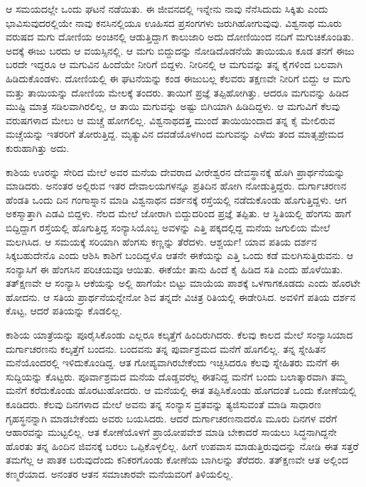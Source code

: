ಆ ಸಮಯದಲ್ಲೇ ಒಂದು ಘಟನೆ ನಡೆಯಿತು. ಈ ಜೀವನದಲ್ಲಿ ಇನ್ನೇನು ನಾವು ನೆನೆಸಿದುದು ಸಿಕ್ಕಿತು ಎಂದು ಭಾವಿಸುವುದರಲ್ಲಿಯೇ ನಾವು ಕನಸಿನಲ್ಲಿಯೂ ಊಹಿಸದ ಪ್ರಸಂಗಗಳು ಜರುಗಿಹೋಗುವುವು. ವಿಶ್ವನಾಥ ಮೂರು ವರುಷದ ಮಗು ದೋಣಿಯ ಅಂಚಿನಲ್ಲಿ ಆಡುತ್ತಿದ್ದಾಗ ಕಾಲುಜಾರಿ ಅದು ದೋಣಿಯಿಂದ ನದಿಗೆ ಮಗುಚಿಕೊಂಡಿತು. ಅದಕ್ಕೆ ಈಜು ಬರದು ಆ ವಯಸ್ಸಿನಲ್ಲಿ. ಆ ಮಗು ಬಿದ್ದುದನ್ನು ನೋಡಿದೊಡನೆಯೆ ತಾಯಿಯೂ ಕೂಡ ತನಗೆ ಈಜು ಬರದೇ ಇದ್ದರೂ ಆ ಮಗುವಿನ ಹಿಂದೆಯೇ ನೀರಿಗೆ ಬಿದ್ದಳು. ನೀರಿನಲ್ಲಿ ಆ ಮಗುವನ್ನು ತನ್ನ ಕೈಗಳಿಂದ ಬಲವಾಗಿ ಹಿಡಿದುಕೊಂಡಳು. ದೋಣಿಯಲ್ಲಿ ಈ ಘಟನೆಯನ್ನು ಕಂಡ ಈಜುಬಲ್ಲ ಕೆಲವರು ತಕ್ಷಣವೇ ನೀರಿಗೆ ಬಿದ್ದು ಆ ಮಗು ಮತ್ತು ತಾಯಿಯನ್ನು ದೋಣಿಯ ಮೇಲಕ್ಕೆ ತಂದರು. ತಾಯಿಗೆ ಪ್ರಜ್ಞೆ ತಪ್ಪಿಹೋಗಿತ್ತು. ಆದರೂ ಮಗುವನ್ನು ಹಿಡಿದ ಮುಷ್ಟಿ ಮಾತ್ರ ಸಡಿಲವಾಗಿರಲಿಲ್ಲ, ಆ ತಾಯಿ ಮಗುವನ್ನು ಅಷ್ಟು ಬಿಗಿಯಾಗಿ ಹಿಡಿದಿದ್ದಳು. ಆ ಮಗುವಿಗೆ ಕೆಲವು ವರುಷಗಳಾದ ಮೇಲು ಆ ಮಚ್ಚೆ ಹೋಗಲಿಲ್ಲ. ವಿಶ್ವನಾಥದತ್ತ ಮುಂದೆ ತಾಯಿಯಿಂದಾದ ತನ್ನ ಕೈ ಮೇಲಿರುವ ಮಚ್ಚೆಯನ್ನು ಇತರರಿಗೆ ತೋರುತ್ತಿದ್ದ. ಮೃತ್ಯುವಿನ ದವಡೆಯೊಳಗಿಂದ ಮಗುವನ್ನು ಎಳೆದು ತಂದ ಮಾತೃಪ್ರೇಮದ ಕುರುಹಾಗಿತ್ತು ಅದು. 

ಕಾಶಿಯ ಊರನ್ನು ಸೇರಿದ ಮೇಲೆ ಅವರ ಮನೆಯ ದೇವರಾದ ವೀರೇಶ್ವರನ ದೇವಸ್ಥಾನಕ್ಕೆ ಹೊಗಿ ಪ್ರಾರ್ಥನೆಯನ್ನು ಮಾಡಿದರು. ಅನಂತರ ಅಲ್ಲಿರುವ ಇತರ ದೇವಾಲಯಗಳನ್ನೂ ಪ್ರತಿದಿನ ಹೋಗಿ ನೋಡುತ್ತಿದ್ದರು. ದುರ್ಗಾಚರಣನ ಹೆಂಡತಿ ಒಂದು ದಿನ ಗಂಗಾಸ್ನಾನ ಮಾಡಿ ವಿಶ್ವನಾಥನ ದರ್ಶನಕ್ಕೆ ರಸ್ತೆಯಲ್ಲಿ ನಡೆದುಕೊಂಡು ಹೊಗುತ್ತಿದ್ದಳು. ಆಗ ಅಕಸ್ಮಾತ್ತಾಗಿ ಎಡವಿ ಬಿದ್ದಳು. ನೆಲದ ಮೇಲೆ ಜೋರಾಗಿ ಬಿದ್ದುದರಿಂದ ಪ್ರಜ್ಞೆ ತಪ್ಪಿತು. ಆ ಸ್ಥಿತಿಯಲ್ಲಿ ಹೆಂಗಸು ಹಾಗೆ ಬಿದ್ದಿದ್ದಾಗ ರಸ್ತೆಯಲ್ಲಿ ಹೊಗುತ್ತಿದ್ದ ಸಂನ್ಯಾಸಿಯೊಬ್ಬ ಅವಳನ್ನು ಎತ್ತಿ ಪಕ್ಕದಲ್ಲಿದ್ದ ಮನೆಯ ಜಗುಲಿಯ ಮೇಲೆ ಮಲಗಿಸಿದ. ಆ ಸಮಯಕ್ಕೆ ಸರಿಯಾಗಿ ಹೆಂಗಸು ಕಣ್ಣನ್ನು ತೆರೆದಳು. ಆಶ್ಚರ್ಯ! ಯಾವ ಪತಿಯ ದರ್ಶನ ಸಿಕ್ಕಬಹುದೇನೊ ಎಂದು ಆಶಿಸಿ ಕಾಶಿಗೆ ಬಂದಿದ್ದಳೊ ಆತನೇ ಈಕೆಯನ್ನು ಎತ್ತಿ ಒಂದು ಕಡೆ ಮಲಗಿಸುತ್ತಿರುವನು. ಆ ಸಂನ್ಯಾಸಿಗೆ ಈ ಹೆಂಗಸಿನ ಪರಿಚಯವೂ ಆಯಿತು. ಈಕೆಯೇ ತಾನು ಹಿಂದೆ ಕೈ ಹಿಡಿದ ಸತಿ ಎಂದು ಹೊಳೆಯಿತು. ತತ್‍ಕ್ಷಣವೇ ಆ ಸಂನ್ಯಾಸಿ ಆಕೆಯನ್ನು ಅಲ್ಲಿ ಹಾಗೆಯೇ ಬಿಟ್ಟು ಮಾಯೆಯ ಪಾಶಕ್ಕೆ ಒಳಗಾಗಕೂಡದು ಎಂದು ಹೊರಟೇ ಹೋದನು. ಆ ಸತಿಯ ಪ್ರಾರ್ಥನೆಯನ್ನೇನೋ ಶಿವ ತನ್ನದೇ ವಿಚಿತ್ರ ರಿತಿಯಲ್ಲಿ ಈಡೇರಿಸಿದ. ಅವಳಿಗೆ ಪತಿಯ ದರ್ಶನ ಕೊಟ್ಟ, ಆದರೆ ಪತಿಯನ್ನು ಕೊಡಲಿಲ್ಲ. 

ಕಾಶಿಯ ಯಾತ್ರೆಯನ್ನು ಪೂರೈಸಿಕೊಂಡು ಎಲ್ಲರೂ ಕಲ್ಕತ್ತೆಗೆ ಹಿಂದಿರುಗಿದರು. ಕೆಲವು ಕಾಲದ ಮೇಲೆ ಸಂನ್ಯಾಸಿಯಾದ ದುರ್ಗಾಚರಣನು ಕಲ್ಕತ್ತೆಗೆ ಬಂದನು. ಬಂದವನು ತನ್ನ ಪುರ್ವಾಶ್ರಮದ ಮನೆಗೆ ಹೊಗಲಿಲ್ಲ. ತನ್ನ ಸ್ನೇಹಿತನ ಮನೆಯೊಂದರಲ್ಲಿ ಇಳಿದುಕೊಂಡಿದ್ದ. ಆತ ಗೋಪ್ಯವಾಗಿರಬೇಕೆಂದು ಇಚ್ಛಿಸಿದರೂ ಕೆಲವು ಸ್ನೇಹಿತರು ಮನೆಗೆ ಈ ಸುದ್ದಿಯನ್ನು ಕೊಟ್ಟರು. ಪೂರ್ವಾಶ್ರಮದ ಮನೆಯ ದೊಡ್ಡವರೆಲ್ಲ ಈತನಿದ್ದ ಮನೆಗೆ ಬಂದು ಬಲಾತ್ಕಾರವಾಗಿ ತಮ್ಮ ಮನೆಗೆ ಕರೆದುಕೊಂಡು ಹೊರಟುಹೋದರು. ಆ ಮನೆಯಲ್ಲಿ ಈತ ತಪ್ಪಿಸಿಕೊಂಡು ಹೊಗದಂತೆ ಒಂದು ಕೋಣೆಯಲ್ಲಿ ಕೂಡಿದರು. ಕೆಲವು ದಿನಗಳಾದ ಮೇಲೆ ಅವನು ತನ್ನ ಸಂನ್ಯಾಸ ವ್ರತವನ್ನು ತ್ಯಜಿಸುವಂತೆ ಮಾಡಿ ಸಾಧಾರಣ ಗೃಹಸ್ಥನನ್ನಾಗಿ ಮಾಡಬೇಕೆಂದು ಅವರು ಬಯಸಿದರು. ಆದರೆ ದುರ್ಗಾಚರಣನಾದರೊ ಮೂರು ದಿನಗಳ ವರೆಗೆ ಆಹಾರವನ್ನು ಮುಟ್ಟಲಿಲ್ಲ. ಆತ ಕೋಣೆಯೊಳಗೆ ಪ್ರಾಯೋಪವೇಶ ಮಾಡಿ ಬೇಕಾದರೆ ಸಾಯಲು ಸಿದ್ಧನಾಗಿದ್ದನೇ ಹೊರತು ತನ್ನ ಹಿಂದಿನ ಜಿವನಕ್ಕೆ ಬರಲು ಒಪ್ಪಿಕೊಳ್ಳಲಿಲ್ಲ. ಹೀಗೆ ಉಪವಾಸ ಮಾಡುತ್ತಿರುವುದನ್ನು ನೋಡಿ ಈತ ಸತ್ತರೆ ತಮಗೆಲ್ಲ ಆ ಪಾತಕ ಬರುವುದೆಂದು ಕನಿಕರಗೊಂಡು ಕೋಣೆಯ ಬಾಗಿಲನ್ನು ತೆರೆದರು. ತತ್‍ಕ್ಷಣವೇ ಆತ ಅಲ್ಲಿಂದ ಕಣ್ಮರೆಯಾದ. ಅನಂತರ ಆತನ ಸಮಾಚಾರವೇ ಮನೆಯವರಿಗೆ ತಿಳಿಯಲಿಲ್ಲ. 

